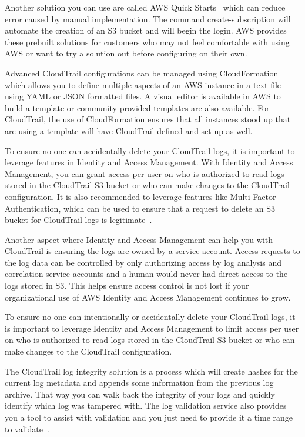 Another solution you can use are called AWS Quick 
Starts~\cite{hid-sp18-518-CloudTrail-Quick-Starts} which can reduce error 
caused by manual implementation. The command create-subscription will automate the 
creation of an S3 bucket and will begin the login. AWS provides these prebuilt
solutions for customers who may not feel comfortable with using AWS or want
to try a solution out before configuring on their own.

Advanced CloudTrail configurations can be managed using 
CloudFormation~\cite{hid-sp18-518-CloudTrail-CloudFormation} which allows you
to define multiple aspects of an AWS instance in a text file using YAML or 
JSON formatted files. A visual editor is available in AWS to build a template
or community-provided templates are also available. For CloudTrail, the use
of CloudFormation ensures that all instances stood up that are using a template
will have CloudTrail defined and set up as well.

To ensure no one can  accidentally delete your CloudTrail logs,
it is important to leverage features in Identity and Access Management. With 
Identity and Access Management, you can grant access per user on who is 
authorized to read logs stored in the CloudTrail S3 bucket 
or who can make changes to the CloudTrail configuration. It is also recommended 
to leverage features like Multi-Factor Authentication, which can be used to 
ensure that a request to delete an S3 bucket for CloudTrail logs is 
legitimate~\cite{hid-sp18-518-CloudTrail-user-guide}. 

Another aspect where Identity and Access Management can help you with CloudTrail 
is ensuring the logs are owned by a service account. Access requests to the log 
data can be controlled by only authorizing access by log analysis and correlation 
service accounts and a human would never had direct access to the logs stored in 
S3. This helps ensure access control is not lost if your organizational use of 
AWS Identity and Access Management continues to grow. 

To ensure no one can intentionally or accidentally delete your CloudTrail logs,
 it is important to leverage Identity and Access Management to limit access 
per user on who is authorized to read logs stored in the CloudTrail S3 bucket 
or who can make changes to the CloudTrail configuration. 

The CloudTrail log integrity solution is a process which will create hashes 
for the current log metadata and appends some information from the previous log 
archive. That way you can walk back the integrity of your logs and quickly 
identify which log was tampered with. The log validation service also provides 
you a tool to assist with validation and you just need to provide it a time 
range to validate~\cite{hid-sp18-518-CloudTrail-log-sharing}.

